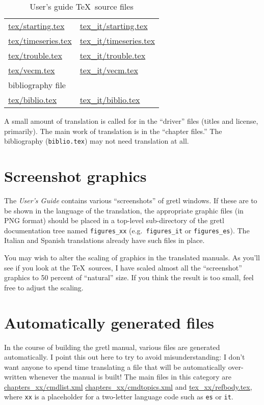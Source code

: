 \documentclass{article}
\begin{document}
\begin{table}[htbp]
\begin{center}
\begin{tabular}{ll}
\url{tex/starting.tex} & \url{tex_it/starting.tex} \\
\url{tex/timeseries.tex} & \url{tex_it/timeseries.tex} \\
\url{tex/trouble.tex} & \url{tex_it/trouble.tex} \\
\url{tex/vecm.tex} & \url{tex_it/vecm.tex} \\ [6pt]
\multicolumn{2}{l}{bibliography file} \\
\url{tex/biblio.tex} & \url{tex_it/biblio.tex} \\
\end{tabular}
\end{center}
\caption{User's guide \TeX\ source files}
\label{guide-files}
\end{table}

A small amount of translation is called for in the ``driver'' files
(titles and license, primarily).  The main work of translation is in
the ``chapter files.''  The bibliography (\texttt{biblio.tex}) may not
need translation at all.

\section{Screenshot graphics}

The \textit{User's Guide} contains various ``screenshots'' of
\textsf{gretl} windows.  If these are to be shown in the language of
the translation, the appropriate graphic files (in \textsf{PNG}
format) should be placed in a top-level sub-directory of the
\textsf{gretl} documentation tree named \texttt{figures\_xx} (e.g.\ 
\texttt{figures\_it} or \texttt{figures\_es}).  The Italian and
Spanish translations already have such files in place.

You may wish to alter the scaling of graphics in the translated
manuals.  As you'll see if you look at the \TeX\ sources, I have
scaled almost all the ``screenshot'' graphics to 50 percent of
``natural'' size.  If you think the result is too small, feel free to
adjust the scaling.


\section{Automatically generated files}

In the course of building the gretl manual, various files are
generated automatically.  I point this out here to try to avoid
misunderstanding: I don't want anyone to spend time translating a
file that will be automatically over-written whenever the manual is
built!  The main files in this category are
%
\url{chapters_xx/cmdlist.xml}
\url{chapters_xx/cmdtopics.xml}
%
and
%
\url{tex_xx/refbody.tex},
%
where \texttt{xx} is a placeholder for a two-letter language code
such as \texttt{es} or \texttt{it}.  
\end{document}

